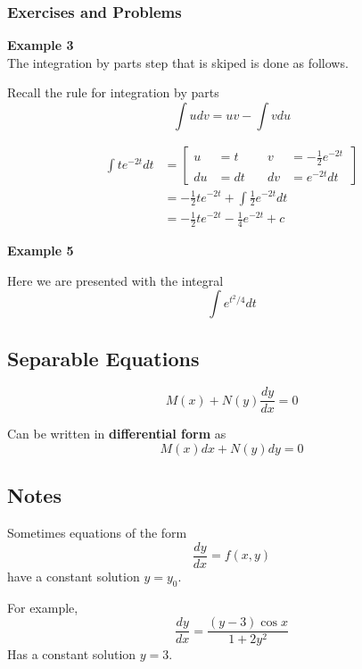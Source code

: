 \subsubsection{Exercises and Problems}

\textbf{Example 3}
\\

The integration by parts step that is skiped is done as follows.

Recall the rule for integration by parts
$$
\int u dv = uv - \int v du
$$

\begin{align*}
\int t e^{-2t} dt &= 
    \left[
      \begin{alignedat}{2}
      u  &= t   \quad & v  &= -\frac{1}{2}e^{-2t} \\
      du &= dt  \quad & dv &= e^{-2t} dt 
      \end{alignedat}\,
    \right] \\
&= -\frac{1}{2} t e^{-2t} + \int \frac{1}{2}e^{-2t} dt \\
&= -\frac{1}{2} t e^{-2t} - \frac{1}{4}e^{-2t} + c
\end{align*}





\textbf{Example 5}

Here we are presented with the integral
$$
\int e^{t^2/4} dt
$$







\subsection{Separable Equations}

$$
M(x) + N(y) \frac{dy}{dx} = 0
$$

Can be written in \textbf{differential form} as
$$
M(x)dx + N(y)dy = 0
$$


\subsection{Notes}

Sometimes equations of the form
$$
\frac{dy}{dx} = f(x,y)
$$
have a constant solution $y = y_0$.

For example,
$$
\frac{dy}{dx} = \frac{(y-3) \cos{x}}{1+2y^2}
$$
Has a constant solution $y=3$.
\\





